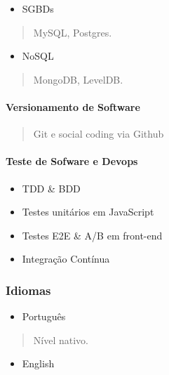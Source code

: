 \documentclass[]{article}
\providecommand{\tightlist}{%
  \setlength{\itemsep}{0pt}\setlength{\parskip}{0pt}}
\let\oldparagraph\paragraph
\renewcommand{\paragraph}[1]{\oldparagraph{#1}\mbox{}}
\begin{document}
\begin{itemize}
\tightlist
\item
  SGBDs
\end{itemize}

\begin{quote}
MySQL, Postgres.
\end{quote}

\begin{itemize}
\tightlist
\item
  NoSQL
\end{itemize}

\begin{quote}
MongoDB, LevelDB.
\end{quote}

\paragraph{Versionamento de Software}\label{versionamento-de-software}

\begin{quote}
Git e social coding via Github
\end{quote}

\paragraph{Teste de Sofware e Devops}\label{teste-de-sofware-e-devops}

\begin{itemize}
\item
  TDD \& BDD
\item
  Testes unitários em JavaScript
\item
  Testes E2E \& A/B em front-end
\item
  Integração Contínua
\end{itemize}

\subsubsection{Idiomas}\label{idiomas}

\begin{itemize}
\tightlist
\item
  Português
\end{itemize}

\begin{quote}
Nível nativo.
\end{quote}

\begin{itemize}
\tightlist
\item
  English
\end{itemize}
\end{document}
